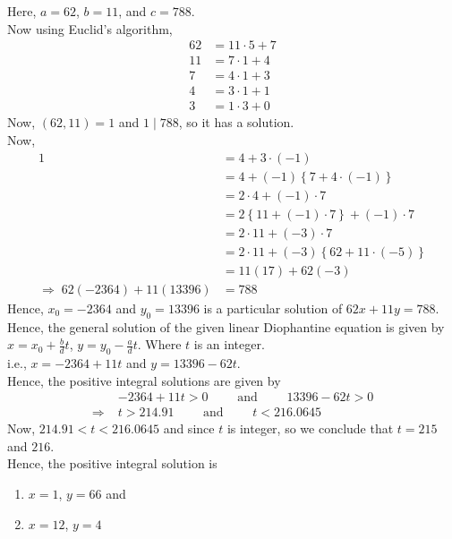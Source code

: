 \documentclass[12pt,class=book,crop=false]{standalone}
\begin{document}
\begin{soln}
    Here, $ a=62 $, $ b=11 $, and $ c=788 $.\\
    Now using Euclid's algorithm,
    \begin{align*}
        62&=11\cdot 5+7\\
        11&=7\cdot 1+4\\
        7&=4\cdot 1+3\\
        4&=3\cdot 1+1\\
        3&=1\cdot 3+0
    \end{align*}
    Now, $ (62,11)=1 $ and $ 1\mid 788 $, so it has a solution.\\
    Now, 
    \begin{align*}
        1&= 4+3\cdot(-1)\\
        &= 4+(-1)\left\{ 7+4\cdot(-1) \right\}\\
        &= 2\cdot4+(-1)\cdot7\\
        &= 2\left\{ 11+(-1)\cdot7 \right\}+(-1)\cdot7\\
        &= 2\cdot 11+(-3)\cdot7 \\
        &= 2\cdot 11+(-3)\left\{ 62+11\cdot(-5) \right\} \\
        &= 11(17)+62(-3)\\
        \Rightarrow\; 62(-2364)+11(13396)&= 788
    \end{align*}
    Hence, $ x_0=-2364 $ and $ y_0=13396 $ is a particular solution of $ 62x+11y=788 $.\\
    Hence, the general solution of the given linear Diophantine equation is given by $ x=x_0+\frac{b}{d}t $, $ y=y_0-\frac{a}{d}t $. Where $ t $ is an integer.\\
    i.e., $ x=-2364+11t $ and $ y=13396-62t $.\\
    Hence, the positive integral solutions are given by 
    \begin{align*}
        &-2364+11t>0 \qquad\text{ and } \qquad 13396-62t>0\\
        \Rightarrow\;&t>214.91 \qquad\text{ and } \qquad t<216.0645 
    \end{align*}
    Now, $ 214.91<t<216.0645 $ and since $ t $ is integer, so we conclude that $ t=215 $ and $ 216 $.\\
    Hence, the positive integral solution is 
    \begin{enumerate}[label=(\roman*)]
        \item $ x=1 $, $ y=66 $  and
        \item $ x=12 $, $ y=4 $
    \end{enumerate}
\end{soln}
\end{document}
